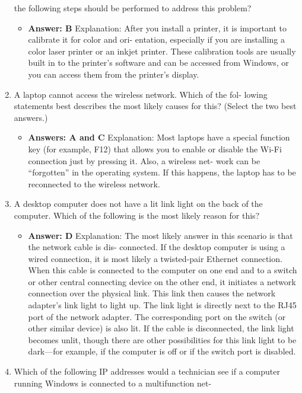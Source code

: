 \documentclass{article}
\begin{document}
\begin{enumerate}
the following steps should be performed to address this problem?
    \begin{itemize}
        \item \textbf{Answer: B}
Explanation: After you install a printer, it is important to calibrate it for color and ori-
entation, especially if you are installing a color laser printer or an inkjet printer. These
calibration tools are usually built in to the printer’s software and can be accessed from
Windows, or you can access them from the printer’s display.
    \end{itemize}
    \item A laptop cannot access the wireless network. Which of the fol-
lowing statements best describes the most likely causes for this?
(Select the two best answers.)
    \begin{itemize}
        \item \textbf{Answers: A and C}
Explanation: Most laptops have a special function key (for example, F12) that allows
you to enable or disable the Wi-Fi connection just by pressing it. Also, a wireless net-
work can be “forgotten” in the operating system. If this happens, the laptop has to be
reconnected to the wireless network.
    \end{itemize}
    \item A desktop computer does not have a lit link light on the back of
the computer. Which of the following is the most likely reason for
this?
    \begin{itemize}
        \item \textbf{ Answer: D}
Explanation: The most likely answer in this scenario is that the network cable is dis-
connected. If the desktop computer is using a wired connection, it is most likely a
twisted-pair Ethernet connection. When this cable is connected to the computer on one
end and to a switch or other central connecting device on the other end, it initiates a
network connection over the physical link. This link then causes the network adapter’s
link light to light up. The link light is directly next to the RJ45 port of the network
adapter. The corresponding port on the switch (or other similar device) is also lit. If the
cable is disconnected, the link light becomes unlit, though there are other possibilities
for this link light to be dark—for example, if the computer is off or if the switch port is
disabled.
    \end{itemize}
    \item Which of the following IP addresses would a technician see if a
computer running Windows is connected to a multifunction net-

\end{enumerate}
\end{document}
